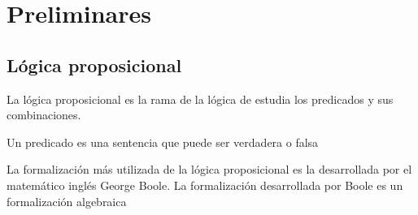 \chapter{Preliminares}
\label{preliminares}

\newcommand{\disj}[1]{\ensuremath{[#1]}}
\newcommand{\conj}[1]{\ensuremath{\{#1\}}}

\section{Lógica proposicional}
La lógica proposicional es la rama de la lógica de estudia los predicados y sus combinaciones.
\begin{definition}
 Un predicado es una sentencia que puede ser verdadera o falsa
\end{definition}

La formalización más utilizada de la lógica proposicional es la desarrollada
por el matemático inglés George Boole.  La formalización desarrollada por
Boole es un formalización algebraica

